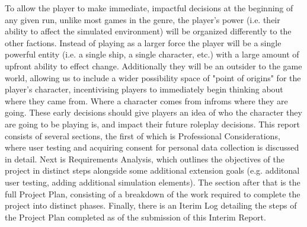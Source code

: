 \documentclass{report}
\begin{document}
To allow the player to make immediate, impactful decisions at the beginning of any given run, unlike most games in the genre, the player's power (i.e. their ability to affect the simulated environment) will be organized differently to the other factions. Instead of playing as a larger force the player will be a single powerful entity (i.e. a single ship, a single character, etc.) with a large amount of upfront ability to effect change. Additionally they will be an outsider to the game world, allowing us to include a wider possibility space of "point of origins" for the player's character, incentivising players to immediately begin thinking about where they came from. Where a character comes from infroms where they are going. These early decisions should give players an idea of who the character they are going to be playing is, and impact their future roleplay decisions.
\newline
\newline
This report consists of several sections, the first of which is Professional Considerations, where user testing and acquiring consent for personal data collection is discussed in detail. Next is Requirements Analysis, which outlines the objectives of the project in distinct steps alongside some additional extension goals (e.g. additonal user testing, adding additional simulation elements). The section after that is the full Project Plan, consisting of a breakdown of the work required to complete the project into distinct phases. Finally, there is an Iterim Log detailing the steps of the Project Plan completed as of the submission of this Interim Report.
\end{document}
